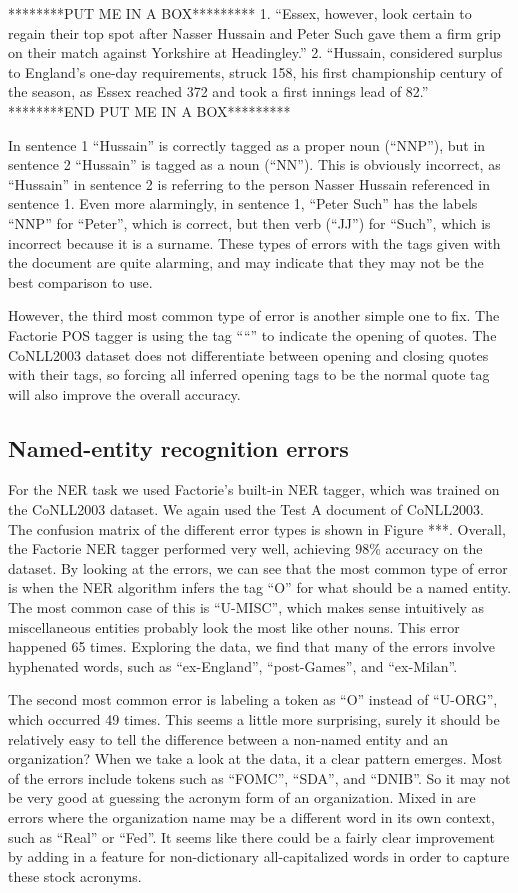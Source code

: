 \documentclass[12pt]{article}
\begin{document}
********PUT ME IN A BOX*********
1. “Essex, however, look certain to regain their top spot after Nasser Hussain and Peter Such gave them a firm grip on their match against Yorkshire at Headingley.”
2. “Hussain, considered surplus to England’s one-day requirements, struck 158, his first championship century of the season, as Essex reached 372 and took a first innings lead of 82.”
********END PUT ME IN A BOX*********

In sentence 1 “Hussain” is correctly tagged as a proper noun (“NNP”), but in sentence 2 “Hussain” is tagged as a noun (“NN”). This is obviously incorrect, as “Hussain” in sentence 2 is referring to the person Nasser Hussain referenced in sentence 1. Even more alarmingly, in sentence 1, “Peter Such” has the labels “NNP” for “Peter”, which is correct, but then verb (“JJ”) for “Such”, which is incorrect because it is a surname. These types of errors with the tags given with the document are quite alarming, and may indicate that they may not be the best comparison to use.

However, the third most common type of error is another simple one to fix. The Factorie POS tagger is using the tag “``” to indicate the opening of quotes. The CoNLL2003 dataset does not differentiate between opening and closing quotes with their tags, so forcing all inferred opening tags to be the normal quote tag will also improve the overall accuracy.

\subsection{Named-entity recognition errors}
For the NER task we used Factorie’s built-in NER tagger, which was trained on the CoNLL2003 dataset. We again used the Test A document of CoNLL2003. The confusion matrix of the different error types is shown in Figure ***. Overall, the Factorie NER tagger performed very well, achieving 98\% accuracy on the dataset. By looking at the errors, we can see that the most common type of error is when the NER algorithm infers the tag “O” for what should be a named entity. The most common case of this is “U-MISC”, which makes sense intuitively as miscellaneous entities probably look the most like other nouns. This error happened 65 times. Exploring the data, we find that many of the errors involve hyphenated words, such as “ex-England”, “post-Games”, and “ex-Milan”. 

The second most common error is labeling a token as “O” instead of “U-ORG”, which occurred 49 times. This seems a little more surprising, surely it should be relatively easy to tell the difference between a non-named entity and an organization? When we take a look at the data, it a clear pattern emerges. Most of the errors include tokens such as “FOMC”, “SDA”, and “DNIB”. So it may not be very good at guessing the acronym form of an organization. Mixed in are errors where the organization name may be a different word in its own context, such as “Real” or “Fed”. It seems like there could be a fairly clear improvement by adding in a feature for non-dictionary all-capitalized words in order to capture these stock acronyms.
\end{document}

